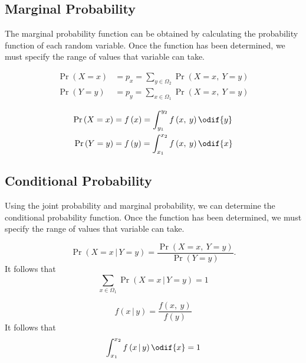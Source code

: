 \documentclass{article}
\begin{document}
\subsection{Marginal Probability}
The marginal probability function can be obtained by calculating the
probability function of each random variable. Once the function has
been determined, we must specify the range of values that variable can
take.
\begin{definition}
    \begin{align*}
        \Pr{\left( X = x \right)} & = p_x = \sum_{y \in \Omega_2} \Pr{\left( X = x,\: Y = y \right)} \\
        \Pr{\left( Y = y \right)} & = p_y = \sum_{x \in \Omega_1} \Pr{\left( X = x,\: Y = y \right)}
    \end{align*}
\end{definition}
\begin{definition}
    \begin{align*}
        \Pr{\left( X = x \right)} & = f\left( x \right) = \int_{y_1}^{y_2} f\left( x,\: y \right) \odif{y} \\
        \Pr{\left( Y = y \right)} & = f\left( y \right) = \int_{x_1}^{x_2} f\left( x,\: y \right) \odif{x}
    \end{align*}
\end{definition}
\subsection{Conditional Probability}
Using the joint probability and marginal probability, we can determine
the conditional probability function. Once the function has been
determined, we must specify the range of values that variable can take.
\begin{definition}
    \begin{equation*}
        \Pr{\left( X = x \,\vert\, Y = y \right)} = \frac{\Pr{\left( X = x,\: Y = y \right)}}{\Pr{\left( Y = y \right)}}.
    \end{equation*}
    It follows that
    \begin{equation*}
        \sum_{x \in \Omega_1} \Pr{\left( X = x \,\vert\, Y = y \right)} = 1
    \end{equation*}
\end{definition}
\begin{definition}
    \begin{equation*}
        f\left( x \,\vert\, y \right) = \frac{f\left( x,\: y \right)}{f\left( y \right)}
    \end{equation*}
    It follows that
    \begin{equation*}
        \int_{x_1}^{x_2} f\left( x \,\vert\, y \right) \odif{x} = 1
    \end{equation*}
\end{definition}
\end{document}
